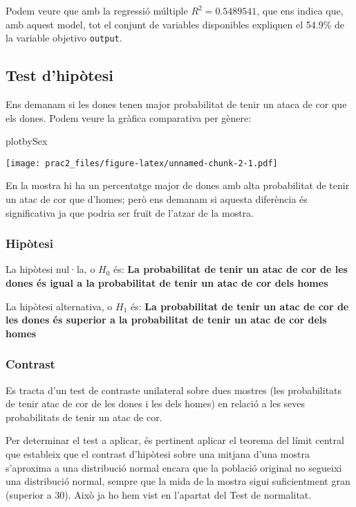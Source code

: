\documentclass[
]{article}
\newenvironment{Shaded}{\begin{snugshade}}{\end{snugshade}}
\newcommand{\NormalTok}[1]{\textcolor[rgb]{0.80,0.80,0.80}{#1}}
\begin{document}
Podem veure que amb la regressió múltiple \(R^2=0.5489541\), que ens
indica que, amb aquest model, tot el conjunt de variables disponibles
expliquen el 54.9\% de la variable objetivo \texttt{output}.

\hypertarget{test-dhipuxf2tesi}{%
\subsection{Test d'hipòtesi}\label{test-dhipuxf2tesi}}

Ens demanam si les dones tenen major probabilitat de tenir un ataca de
cor que els dones. Podem veure la gràfica comparativa per gènere:

\begin{Shaded}
\begin{Highlighting}[]
\NormalTok{plotbySex}
\end{Highlighting}
\end{Shaded}

\texttt{[image: prac2\_files/figure-latex/unnamed-chunk-2-1.pdf]}

En la mostra hi ha un percentatge major de dones amb alta probabilitat
de tenir un atac de cor que d'homes; però ens demanam si aquesta
diferència és significativa ja que podria ser fruït de l'atzar de la
mostra.

\hypertarget{hipuxf2tesi}{%
\subsubsection{Hipòtesi}\label{hipuxf2tesi}}

La hipòtesi nul·la, o \(H_{0}\) és: \textbf{La probabilitat de tenir un
atac de cor de les dones és igual a la probabilitat de tenir un atac de
cor dels homes}

La hipòtesi alternativa, o \(H_{1}\) és: \textbf{La probabilitat de
tenir un atac de cor de les dones és superior a la probabilitat de tenir
un atac de cor dels homes}

\hypertarget{contrast}{%
\subsubsection{Contrast}\label{contrast}}

Es tracta d'un test de contraste unilateral sobre dues mostres (les
probabilitats de tenir atac de cor de les dones i les dels homes) en
relació a les seves probabilitats de tenir un atac de cor.

Per determinar el test a aplicar, és pertinent aplicar el teorema del
límit central que estableix que el contrast d'hipòtesi sobre una mitjana
d'una mostra s'aproxima a una distribució normal encara que la població
original no segueixi una distribució normal, sempre que la mida de la
mostra sigui suficientment gran (superior a 30). Això ja ho hem vist en
l'apartat del Test de normalitat.
\end{document}
